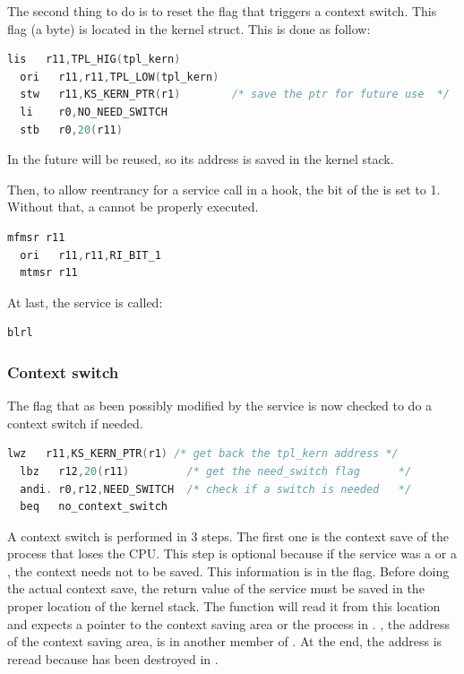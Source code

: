 The second thing to do is to reset the  flag that triggers a context switch. This flag (a byte) is located in the  kernel struct. This is done as follow:

\begin{lstlisting}[language=C]
  lis   r11,TPL_HIG(tpl_kern)
  ori   r11,r11,TPL_LOW(tpl_kern)
  stw   r11,KS_KERN_PTR(r1)        /* save the ptr for future use  */
  li    r0,NO_NEED_SWITCH
  stb   r0,20(r11)
\end{lstlisting}

In the future  will be reused, so its address is saved in the kernel stack.

Then, to allow reentrancy for a service call in a hook, the  bit of the  is set to 1. Without that, a  cannot be  properly executed.

\begin{lstlisting}[language=C]
  mfmsr r11
  ori   r11,r11,RI_BIT_1
  mtmsr r11
\end{lstlisting}

At last, the service is called:

\begin{lstlisting}[language=C]
  blrl
\end{lstlisting}

\subsubsection{Context switch}

The  flag that as been possibly modified by the service is now checked to do a context switch if needed.

\begin{lstlisting}[language=C]
  lwz   r11,KS_KERN_PTR(r1) /* get back the tpl_kern address */
  lbz   r12,20(r11)         /* get the need_switch flag      */
  andi. r0,r12,NEED_SWITCH  /* check if a switch is needed   */
  beq   no_context_switch
\end{lstlisting}

A context switch is performed in 3 steps. The first one is the context save of the process that loses the CPU. This step is optional because if the service was a  or a , the context needs not to be saved. This information is in the  flag. Before doing the actual context save, the return value of the service must be saved in the proper location of the kernel stack. The  function will read it from this location and expects a pointer to the context saving area or the process in . , the address of the context saving area, is in another member of . At the end, the  address is reread because  has been destroyed in . 

